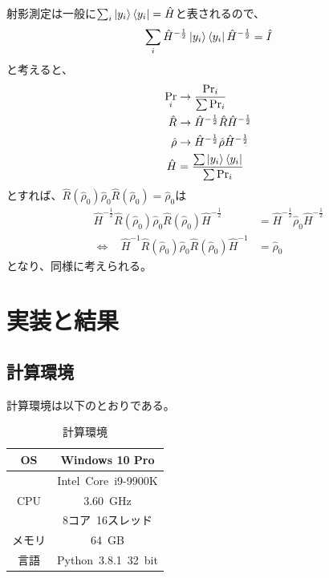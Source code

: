 \documentclass[11pt,a4j,notitlepage]{jreport}
\begin{document}
	射影測定は一般に$\sum_i \ket{y_i} \bra{y_i} = \hat{H}$と表されるので、
	\begin{equation}
		\sum_i \hat{H}^{- \frac{1}{2}} \ket{y_i} \bra{y_i} \hat{H}^{- \frac{1}{2}} = \hat{I}
	\end{equation}
	と考えると、
	\begin{equation*}
		\begin{aligned}
			\Pr_i &\to \frac{\Pr_i}{\sum \Pr_i} \\
			\hat{R} &\to \hat{H}^{- \frac{1}{2}} \hat{R} \hat{H}^{- \frac{1}{2}} \\
			\hat{\rho} &\to \hat{H}^{- \frac{1}{2}} \hat{\rho} \hat{H}^{- \frac{1}{2}} \\
			\hat{H} &= \frac{\sum \ket{y_i} \bra{y_i}}{\sum \Pr_i}
		\end{aligned}
	\end{equation*}
	とすれば、$\hat{R} (\hat{\rho}_0) \hat{\rho}_0 \hat{R} (\hat{\rho}_0) = \hat{\rho}_0$は
	\begin{equation}
		\begin{aligned}
			\hat{H}^{- \frac{1}{2}} \hat{R} (\hat{\rho}_0) \hat{\rho}_0 \hat{R} (\hat{\rho}_0) \hat{H}^{- \frac{1}{2}} &= \hat{H}^{- \frac{1}{2}} \hat{\rho}_0 \hat{H}^{- \frac{1}{2}} \\
			\Longleftrightarrow\ \ \ \  \hat{H}^{-1} \hat{R} (\hat{\rho}_0) \hat{\rho}_0 \hat{R} (\hat{\rho}_0) \hat{H}^{-1} &= \hat{\rho}_0
		\end{aligned}
	\end{equation}
	となり、同様に考えられる。

	\chapter{実装と結果}

	\section{計算環境}

	計算環境は以下のとおりである。

	\begin{table}[h]
		\centering
			\caption{計算環境}
			\begin{tabular}{|c|c|}
				\hline
				OS & Windows 10 Pro \\ \hline
				& Intel\ Core\ i9-9900K \\
				CPU & 3.60\ GHz \\
				& 8コア\ 16スレッド　\\ \hline
				メモリ & 64\ GB \\ \hline
				言語 & Python\ 3.8.1\ 32\ bit \\ \hline
			\end{tabular}
	\end{table}
\end{document}
